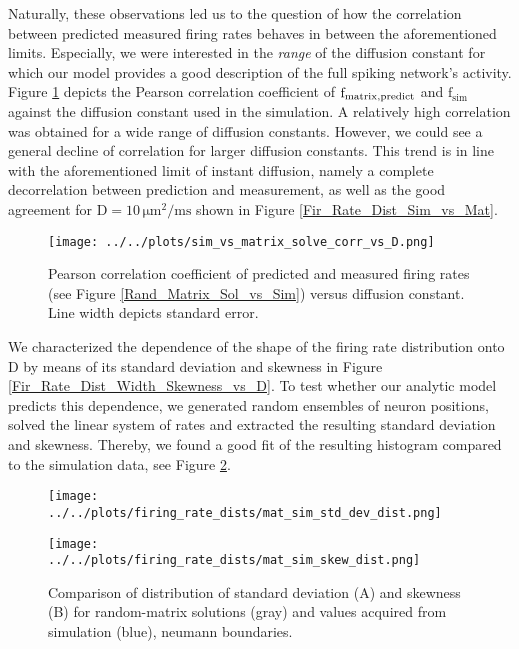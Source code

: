 \documentclass[10pt,a4paper]{article}
\begin{document}
Naturally, these observations led us to the question of how the correlation between predicted measured firing rates behaves in between the aforementioned limits. Especially, we were interested in the \emph{range} of the diffusion constant for which our model provides a good description of the full spiking network's activity. Figure \ref{Corr_Coeff_vs_D} depicts the Pearson correlation coefficient of $\mathrm{f_{matrix \\, predict}}$ and $\mathrm{f_{sim}}$ against the diffusion constant used in the simulation. A relatively high correlation was obtained for a wide range of diffusion constants. However, we could see a general decline of correlation for larger diffusion constants. This trend is in line with the aforementioned limit of instant diffusion, namely a complete decorrelation between prediction and measurement, as well as the good agreement for $\mathrm{D= 10\, \mu m^2 / ms}$ shown in Figure \ref{Fir_Rate_Dist_Sim_vs_Mat}.
\begin{figure}
\begin{center}
\texttt{[image: ../../plots/sim\_vs\_matrix\_solve\_corr\_vs\_D.png]}
\end{center}
\caption{Pearson correlation coefficient of predicted and measured firing rates (see Figure \ref{Rand_Matrix_Sol_vs_Sim}) versus diffusion constant. Line width depicts standard error.}
\label{Corr_Coeff_vs_D}
\end{figure}
We characterized the dependence of the shape of the firing rate distribution onto $\mathrm{D}$ by means of its standard deviation and skewness in Figure \ref{Fir_Rate_Dist_Width_Skewness_vs_D}. To test whether our analytic model predicts this dependence, we generated random ensembles of neuron positions, solved the linear system of rates and extracted the resulting standard deviation and skewness. Thereby, we found a good fit of the resulting histogram compared to the simulation data, see Figure \ref{Std_Skew_Dist_vs_Data}.
\begin{figure}
\begin{minipage}{0.5\textwidth}
\texttt{[image: ../../plots/firing\_rate\_dists/mat\_sim\_std\_dev\_dist.png]}
\end{minipage}
\begin{minipage}{0.5\textwidth}
\texttt{[image: ../../plots/firing\_rate\_dists/mat\_sim\_skew\_dist.png]}
\end{minipage}
\caption{Comparison of distribution of standard deviation (A) and skewness (B) for random-matrix solutions (gray) and values acquired from simulation (blue), neumann boundaries.}
\label{Std_Skew_Dist_vs_Data}
\end{figure}
\end{document}
